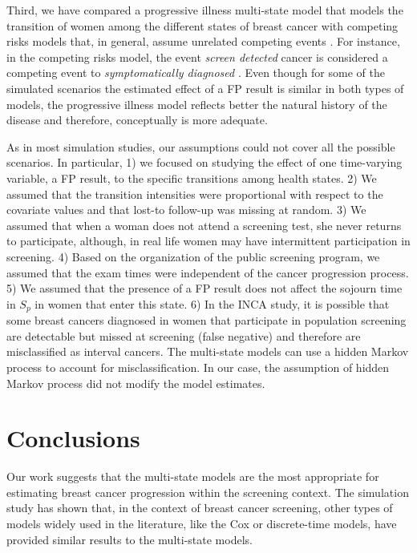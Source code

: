 \documentclass{bmcart}
\begin{document}
Third, we have compared a progressive illness multi-state model that models the transition of women
among the different states of breast cancer with competing risks models that, in general, assume
unrelated competing events \cite{Putter2007}. For instance, in the competing risks model, the event
\textit{screen detected} cancer is considered a competing event to \textit{symptomatically
diagnosed} \cite{Putter2007, Allignol2011}. Even though for some of the simulated scenarios the
estimated effect of a FP result is similar in both types of models, the progressive illness model
reflects better the natural history of the disease and therefore, conceptually is more adequate.

As in most simulation studies, our assumptions could not cover all the possible scenarios. In
particular, 1) we focused on studying the effect of one time-varying variable, a FP result, to the
specific transitions among health states. 2) We assumed that the transition intensities were
proportional with respect to the covariate values and that lost-to follow-up was missing at random.
3) We assumed that when a woman does not attend a screening test, she never returns to participate, although, in real life women may have intermittent participation in screening. 4) Based on the organization of the public screening program, we assumed that the exam times were independent of
the cancer progression process. 5) We assumed that the presence of a FP result does not affect the
sojourn time in $S_p$ in women that enter this state. 6) In the INCA study, it is possible that
some breast cancers diagnosed in women that participate in population screening are detectable but
missed at screening (false negative) and therefore are misclassified as interval cancers. The multi-state models can use a hidden Markov process to account for misclassification. In our case, the assumption of hidden Markov process did not modify the model estimates.


\section*{Conclusions}
Our work suggests that the multi-state models are the most appropriate for estimating breast cancer
progression within the screening context. The simulation study has shown that, in the context of breast cancer screening, other types of models widely used in the literature, like the Cox or discrete-time models, have provided similar results to the multi-state models.
\end{document}
